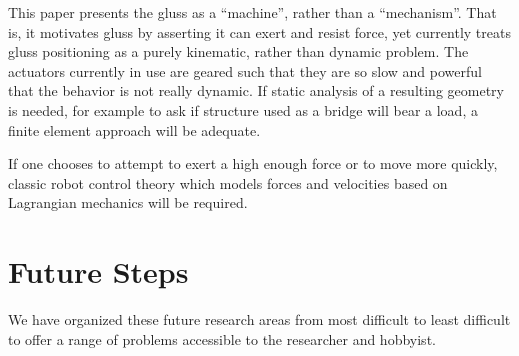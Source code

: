 \documentclass[11pt]{article}
\begin{document}
This paper presents the gluss as a ``machine'', rather than a ``mechanism''. That is, it motivates gluss
by asserting it can exert and resist force, yet currently treats gluss positioning as a purely kinematic,
rather than dynamic problem. The actuators currently in use are geared such that they are so slow
and powerful that the behavior is not really dynamic. If static analysis of a resulting geometry is
needed, for example to ask if structure used as a bridge will bear a load, a finite element approach\cite{géradin2001flexible} will be adequate.

If one chooses to attempt to exert a high enough force or to move more quickly, classic robot control theory
which models forces and velocities based on Lagrangian mechanics will be required.


\section{Future Steps}
\label{futuresteps}

We have organized these future research areas from most difficult to least
difficult to offer a range of problems accessible to the researcher and hobbyist.
\end{document}
